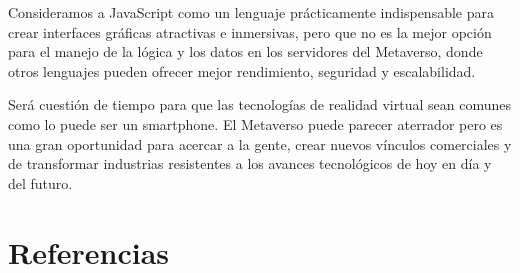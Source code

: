 \documentclass[a4paper,10pt]{article}
\begin{document}
Consideramos a JavaScript como un lenguaje prácticamente indispensable para crear interfaces gráficas atractivas e inmersivas, pero que no es la mejor opción para el manejo de la lógica y los datos en los servidores del Metaverso, donde otros lenguajes pueden ofrecer mejor rendimiento, seguridad y escalabilidad.\par
Será cuestión de tiempo para que las tecnologías de realidad virtual sean comunes como lo puede ser un smartphone. El Metaverso puede parecer aterrador pero es una gran oportunidad para acercar a la gente, crear nuevos vínculos comerciales y de transformar industrias resistentes a los avances tecnológicos de hoy en día y del futuro.
\pagebreak
\section{Referencias}
\printbibliography[heading=none]
\end{document}
